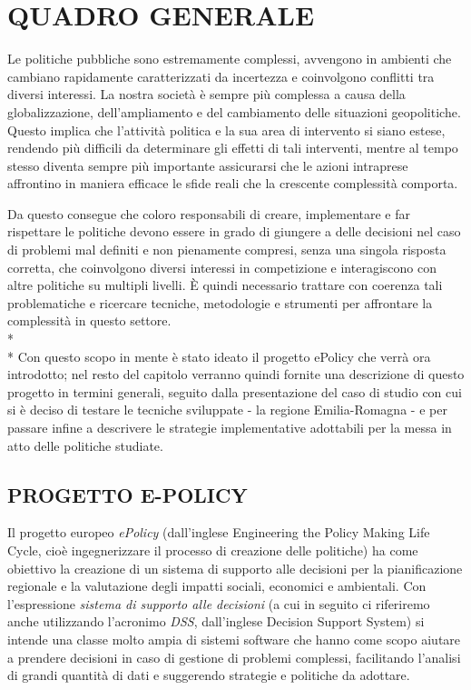 \documentclass[12pt,a4paper,openright,twoside]{report}
\begin{document}
\chapter{\nohyphens{QUADRO GENERALE}}

Le politiche pubbliche sono estremamente complessi, avvengono in ambienti che cambiano rapidamente caratterizzati da incertezza e coinvolgono conflitti tra diversi interessi. La nostra società è sempre più complessa a causa della globalizzazione, dell'ampliamento e del cambiamento delle situazioni geopolitiche. Questo implica che l'attività politica e la sua area di intervento si siano estese, rendendo più difficili da determinare gli effetti di tali interventi, mentre al tempo stesso diventa sempre più importante assicurarsi che le azioni intraprese affrontino in maniera efficace le sfide reali che la crescente complessità comporta.

Da questo consegue che coloro responsabili di creare, implementare e far rispettare le politiche devono essere in grado di giungere a delle decisioni nel caso di problemi mal definiti e non pienamente compresi, senza una singola risposta corretta, che coinvolgono diversi interessi in competizione e interagiscono con altre politiche su multipli livelli. \`E quindi necessario trattare con coerenza tali problematiche e ricercare tecniche, metodologie e strumenti per affrontare la complessità in questo settore.\\*\\*
Con questo scopo in mente è stato ideato il progetto ePolicy che verrà ora introdotto; nel resto del capitolo verranno quindi fornite una descrizione di questo progetto in termini generali, seguito dalla presentazione del caso di studio con cui si è deciso di testare le tecniche sviluppate - la regione Emilia-Romagna - e per passare infine a descrivere le strategie implementative adottabili per la messa in atto delle politiche studiate.


\section[E-POLICY]{PROGETTO E-POLICY}

Il progetto europeo \emph{ePolicy} (dall'inglese Engineering the Policy Making Life Cycle, cioè ingegnerizzare il processo di creazione delle politiche) ha come obiettivo la creazione di un sistema di supporto alle decisioni per la pianificazione regionale e la valutazione degli impatti sociali, economici e ambientali. Con l'espressione \emph{sistema di supporto alle decisioni} (a cui in seguito ci riferiremo anche utilizzando l'acronimo \emph{DSS}, dall'inglese Decision Support System) si intende una classe molto ampia di sistemi software che hanno come scopo aiutare a prendere decisioni in caso di gestione di problemi complessi, facilitando l'analisi di grandi quantità di dati e suggerendo strategie e  politiche da adottare.
\end{document}
